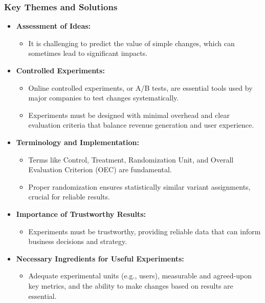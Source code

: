 \documentclass{article}
\begin{document}
\subsubsection*{Key Themes and Solutions}
\begin{itemize}
    \item \textbf{Assessment of Ideas:}
    \begin{itemize}
        \item It is challenging to predict the value of simple changes, which can sometimes lead to significant impacts.
    \end{itemize}
    \item \textbf{Controlled Experiments:}
    \begin{itemize}
        \item Online controlled experiments, or A/B tests, are essential tools used by major companies to test changes systematically.
        \item Experiments must be designed with minimal overhead and clear evaluation criteria that balance revenue generation and user experience.
    \end{itemize}
    \item \textbf{Terminology and Implementation:}
    \begin{itemize}
        \item Terms like Control, Treatment, Randomization Unit, and Overall Evaluation Criterion (OEC) are fundamental.
        \item Proper randomization ensures statistically similar variant assignments, crucial for reliable results.
    \end{itemize}
    \item \textbf{Importance of Trustworthy Results:}
    \begin{itemize}
        \item Experiments must be trustworthy, providing reliable data that can inform business decisions and strategy.
    \end{itemize}
    \item \textbf{Necessary Ingredients for Useful Experiments:}
    \begin{itemize}
        \item Adequate experimental units (e.g., users), measurable and agreed-upon key metrics, and the ability to make changes based on results are essential.
    \end{itemize}
\end{itemize}
\end{document}
